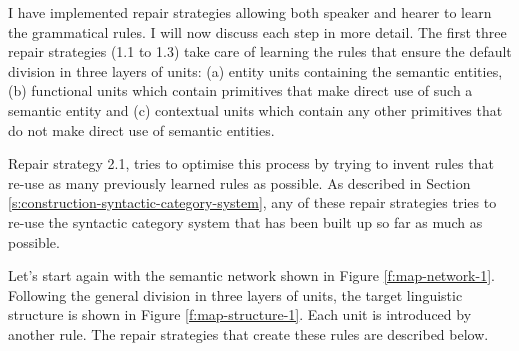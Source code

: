 I have implemented repair strategies allowing both speaker and hearer to
learn the grammatical rules. I will now discuss each step in more
detail. The first three repair strategies (1.1 to 1.3) take care of
learning the rules that ensure the default division in three layers of
units: (a) entity units containing the semantic entities, (b)
functional units which contain primitives that make direct use of such
a semantic entity and (c) contextual units which contain any other
primitives that do not make direct use of semantic entities.

Repair strategy 2.1, tries to optimise this process by trying to invent rules
that re-use as many previously learned rules as possible. As described
in Section \ref{s:construction-syntactic-category-system}, any of
these repair strategies tries to re-use the syntactic category system
that has been built up so far as much as possible.

Let's start again with the semantic network shown in Figure
\ref{f:map-network-1}. Following the general division in three layers
of units, the target linguistic structure is shown in Figure
\ref{f:map-structure-1}. Each unit is introduced by another rule. The
repair strategies that create these rules are described below.

